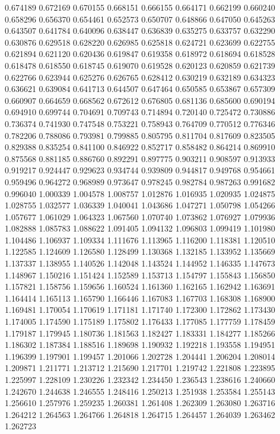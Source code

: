 0.674189
0.672169
0.670155
0.668151
0.666155
0.664171
0.662199
0.660240
0.658296
0.656370
0.654461
0.652573
0.650707
0.648866
0.647050
0.645263
0.643507
0.641784
0.640096
0.638447
0.636839
0.635275
0.633757
0.632290
0.630876
0.629518
0.628220
0.626985
0.625818
0.624721
0.623699
0.622755
0.621894
0.621120
0.620436
0.619847
0.619358
0.618972
0.618694
0.618528
0.618478
0.618550
0.618745
0.619070
0.619528
0.620123
0.620859
0.621739
0.622766
0.623944
0.625276
0.626765
0.628412
0.630219
0.632189
0.634323
0.636621
0.639084
0.641713
0.644507
0.647464
0.650585
0.653867
0.657309
0.660907
0.664659
0.668562
0.672612
0.676805
0.681136
0.685600
0.690194
0.694910
0.699744
0.704691
0.709743
0.714894
0.720140
0.725472
0.730886
0.736374
0.741930
0.747548
0.753221
0.758943
0.764709
0.770512
0.776346
0.782206
0.788086
0.793981
0.799885
0.805795
0.811704
0.817609
0.823505
0.829388
0.835254
0.841100
0.846922
0.852717
0.858482
0.864214
0.869910
0.875568
0.881185
0.886760
0.892291
0.897775
0.903211
0.908597
0.913933
0.919217
0.924447
0.929623
0.934744
0.939809
0.944817
0.949768
0.954661
0.959496
0.964272
0.968989
0.973647
0.978245
0.982784
0.987263
0.991682
0.996040
1.000339
1.004578
1.008757
1.012876
1.016935
1.020935
1.024875
1.028755
1.032577
1.036339
1.040041
1.043686
1.047271
1.050798
1.054266
1.057677
1.061029
1.064323
1.067560
1.070740
1.073862
1.076927
1.079936
1.082888
1.085783
1.088622
1.091405
1.094132
1.096803
1.099419
1.101980
1.104486
1.106937
1.109334
1.111676
1.113965
1.116200
1.118381
1.120510
1.122585
1.124609
1.126580
1.128499
1.130368
1.132185
1.133952
1.135669
1.137337
1.138955
1.140526
1.142048
1.143524
1.144952
1.146335
1.147673
1.148967
1.150216
1.151424
1.152589
1.153713
1.154797
1.155843
1.156850
1.157821
1.158756
1.159656
1.160524
1.161360
1.162165
1.162942
1.163691
1.164414
1.165113
1.165790
1.166446
1.167083
1.167703
1.168308
1.168900
1.169481
1.170054
1.170619
1.171181
1.171740
1.172300
1.172862
1.173430
1.174005
1.174590
1.175189
1.175802
1.176433
1.177085
1.177759
1.178459
1.179187
1.179945
1.180736
1.181563
1.182427
1.183331
1.184277
1.185266
1.186302
1.187384
1.188516
1.189698
1.190932
1.192218
1.193558
1.194951
1.196399
1.197901
1.199457
1.201066
1.202728
1.204441
1.206204
1.208014
1.209871
1.211771
1.213712
1.215690
1.217701
1.219742
1.221808
1.223895
1.225997
1.228109
1.230226
1.232342
1.234450
1.236543
1.238616
1.240660
1.242670
1.244638
1.246555
1.248416
1.250213
1.251938
1.253584
1.255143
1.256610
1.257976
1.259235
1.260381
1.261408
1.262309
1.263080
1.263716
1.264212
1.264563
1.264766
1.264818
1.264715
1.264457
1.264039
1.263462
1.262723
